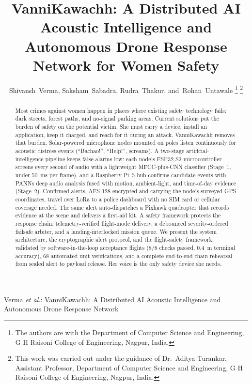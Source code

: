 \documentclass[journal]{IEEEtran}
\begin{document}
\title{VanniKawachh: A Distributed AI Acoustic Intelligence and Autonomous
Drone Response Network for Women Safety}

\author{Shivansh~Verma,
        Saksham~Sabadra,
        Rudra~Thakur,
        and~Rohan~Untawale%
\thanks{The authors are with the Department of Computer Science and
Engineering, G H Raisoni College of Engineering, Nagpur, India.}%
\thanks{This work was carried out under the guidance of Dr.~Aditya Turankar,
Assistant Professor, Department of Computer Science and Engineering,
G H Raisoni College of Engineering, Nagpur, India.}}

%
{Verma \MakeLowercase{\textit{et al.}}: VanniKawachh: A Distributed AI Acoustic Intelligence and Autonomous Drone Response Network}

\maketitle

\begin{abstract}
Most crimes against women happen in places where existing safety technology
fails: dark streets, forest paths, and no-signal parking areas. Current
solutions put the burden of safety on the potential victim. She must carry a
device, install an application, keep it charged, and reach for it during an
attack. VanniKawachh removes that burden. Solar-powered
microphone nodes mounted on poles listen continuously for acoustic distress
events (``Bachao!'', ``Help!'', screams). A two-stage artificial-intelligence
pipeline keeps false alarms low: each node's ESP32-S3 microcontroller screens
every second of audio with a lightweight MFCC-plus-CNN classifier (Stage~1,
under 50~ms per frame), and a Raspberry Pi~5 hub confirms candidate events
with PANNs deep audio analysis fused with motion, ambient-light, and
time-of-day evidence (Stage~2). Confirmed alerts, AES-128 encrypted and
carrying the node's surveyed GPS coordinates, travel over LoRa to a police
dashboard with no SIM card or cellular coverage needed. The same alert
auto-dispatches a Pixhawk quadcopter that records evidence at the scene and
delivers a first-aid kit. A safety framework protects the response chain:
telemetry-verified flight-mode delivery, a debounced severity-ordered
failsafe arbiter, and a landing-interlocked mission queue. We
present the system architecture, the cryptographic alert protocol, and the
flight-safety framework, validated by software-in-the-loop acceptance flights
(8/8 checks passed, 0.4~m terminal accuracy), 68 automated unit
verifications, and a complete end-to-end chain rehearsal from sealed alert to
payload release. Her voice is the only safety device she needs.
\end{abstract}
\end{document}
